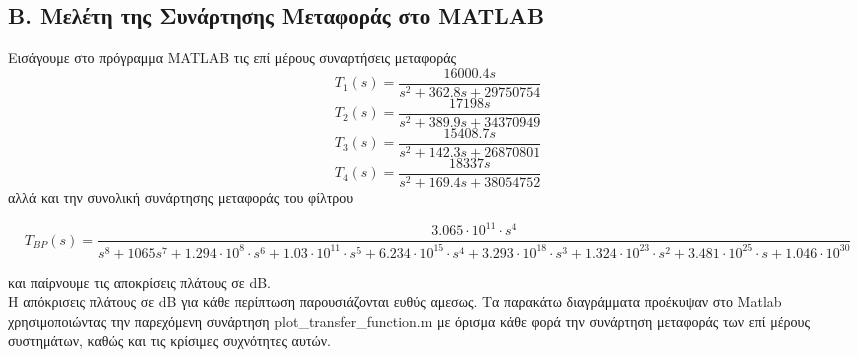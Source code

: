\documentclass{article}
\begin{document}
{{\subsection*{B. Μελέτη της Συνάρτησης Μεταφοράς στο MATLAB}
\large{}
Εισάγουμε στο  πρόγραμμα MATLAB τις επί μέρους συναρτήσεις μεταφοράς
\begin{equation*}
\boxed{
T_1(s) = \frac{16000.4s}{s^2 +362.8s+29750754}}
\end{equation*}
\begin{equation*}
\boxed{
T_2(s) = \frac{17198s}{s^2 +389.9s+34370949}}
\end{equation*}
 \begin{equation*}
\boxed{
T_3(s) = \frac{15408.7s}{s^2 +142.3s+26870801}}
\end{equation*}
\begin{equation*}
\boxed{
T_4(s) = \frac{18337s}{s^2 +169.4s+38054752}}
\end{equation*}
αλλά και την συνολική συνάρτησης μεταφοράς του φίλτρου 
 \small{}
\begin{changemargin}{-3.5cm}{0.5cm} 
\begin{equation*}
\boxed{
T_{BP} (s) = \frac{3.065 \cdot 10^{11} \cdot s^4}{s^8 + 1065 s^7 + 1.294\cdot10^8 \cdot s^6 + 1.03 \cdot 10^{11} \cdot s^5 + 6.234 \cdot 10^{15} \cdot s^4 + 3.293 \cdot 10^{18} \cdot s^3 + 1.324\cdot 10^{23} \cdot s^2 + 3.481 \cdot 10^{25}\cdot s + 1.046 \cdot 10^{30}
 }
 }
\end{equation*}
\end{changemargin}
\large{}
και παίρνουμε τις αποκρίσεις πλάτους σε dB. \\ Η απόκρισεις πλάτους σε dB για κάθε περίπτωση παρουσιάζονται ευθύς αμεσως. Τα παρακάτω διαγράμματα προέκυψαν στο Matlab χρησιμοποιώντας την παρεχόμενη συνάρτηση plot\_transfer\_function.m με όρισμα κάθε φορά την συνάρτηση μεταφοράς των επί μέρους συστημάτων, καθώς και τις κρίσιμες συχνότητες αυτών. 
\\[2.4\baselineskip]

\newpage

\newpage
}}
\end{document}
